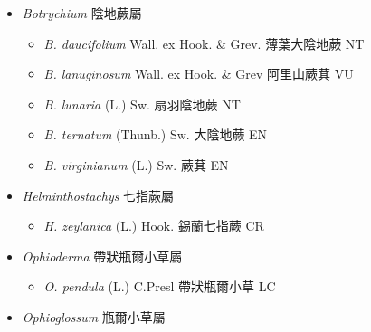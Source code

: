 
  \begin{itemize}
 \item[] \textit{Botrychium} 陰地蕨屬
                                
  \begin{itemize}
        \item[] \textit{B. daucifolium} Wall. ex Hook. \& Grev.  薄葉大陰地蕨   NT
        \item[] \textit{B. lanuginosum} Wall. ex Hook. \& Grev  阿里山蕨萁   VU
        \item[] \textit{B. lunaria} (L.) Sw.  扇羽陰地蕨   NT
        \item[] \textit{B. ternatum} (Thunb.) Sw.  大陰地蕨   EN
        \item[] \textit{B. virginianum} (L.) Sw.  蕨萁   EN
  \end{itemize}
 \item[] \textit{Helminthostachys} 七指蕨屬
                                
  \begin{itemize}
        \item[] \textit{H. zeylanica} (L.) Hook.  錫蘭七指蕨   CR
  \end{itemize}
 \item[] \textit{Ophioderma} 帶狀瓶爾小草屬
                                
  \begin{itemize}
        \item[] \textit{O. pendula} (L.) C.Presl  帶狀瓶爾小草   LC
  \end{itemize}
 \item[] \textit{Ophioglossum} 瓶爾小草屬
                                

\end{itemize}
